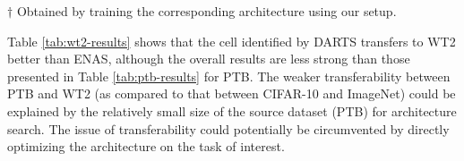 \documentclass{article}
\begin{document}
 \begin{table}[t]
 \centering
 \caption{Comparison with state-of-the-art language models on WT2.}
 \label{tab:wt2-results}
 \begin{threeparttable}[b]
 \begin{tablenotes}
\item[$\dagger$] {\footnotesize Obtained by training the corresponding architecture using our setup.}
\end{tablenotes}
\end{threeparttable}
 \end{table}
 
Table \ref{tab:wt2-results}
shows that the cell identified by DARTS transfers to WT2 better than ENAS,
although the overall results are less strong than those presented in Table \ref{tab:ptb-results} for PTB.
The weaker transferability between PTB and WT2 (as compared to that between CIFAR-10 and ImageNet) could be explained by the relatively small size of the source dataset (PTB) for architecture search. The issue of transferability could potentially be circumvented by directly optimizing the architecture on the task of interest.
 
\end{document}

